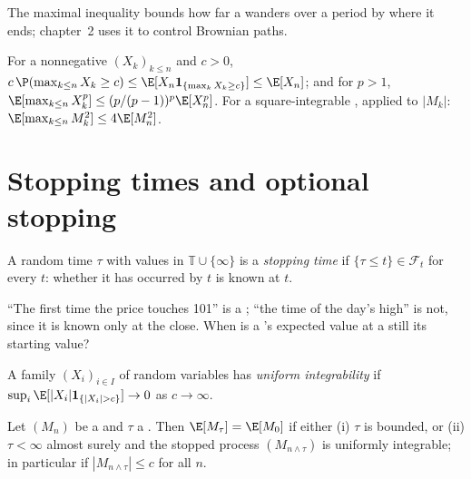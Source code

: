 The maximal inequality bounds how far a  wanders over a period by where it ends;
chapter~2 uses it to control Brownian paths.

\begin{proposition}\label{prop:qm:probability-at-speed:doob}
For a nonnegative  $(X_k)_{k \le n}$ and $c > 0$, $c\,\P(\max_{k\le n}X_k \ge c)
\le \E[X_n\mathbf 1_{\{\max_k X_k \ge c\}}] \le \E[X_n]$; and for $p > 1$, $\E[\max_{k \le
n}X_k^p] \le (p/(p-1))^p\E[X_n^p]$. For a square-integrable , applied to $|M_k|$:
$\E[\max_{k\le n}M_k^2] \le 4\E[M_n^2]$.
\end{proposition}

\admitted

\section{Stopping times and optional stopping}

\begin{definition}\label{def:qm:probability-at-speed:stopping}
A random time $\tau$ with values in $\mathbb T \cup \{\infty\}$ is a \emph{stopping
time} if $\{\tau \le t\} \in \mathcal F_t$ for every $t$: whether it
has occurred by $t$ is known at $t$.
\end{definition}

``The first time the price touches 101'' is a ; ``the time of the day's high''
is not, since it is known only at the close. When is a 's expected value at a
 still its starting value?

\begin{definition}\label{def:qm:probability-at-speed:ui}
A family $(X_i)_{i \in I}$ of random variables has \emph{uniform
integrability} if $\sup_{i}\E[|X_i|\mathbf 1_{\{|X_i| > c\}}]
\to 0$ as $c \to \infty$.
\end{definition}

\begin{theorem}\label{thm:qm:probability-at-speed:optional}
Let $(M_n)$ be a  and $\tau$ a . Then $\E[M_\tau] = \E[M_0]$ if either
(i) $\tau$ is bounded, or (ii) $\tau < \infty$ almost surely and the stopped process
$(M_{n \wedge \tau})$ is uniformly integrable; in particular if $|M_{n\wedge\tau}| \le c$ for
all $n$.
\end{theorem}

